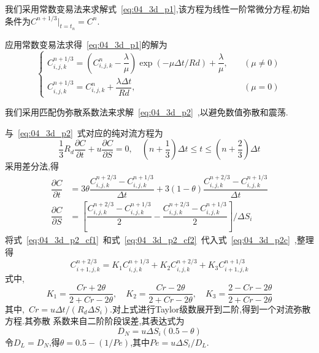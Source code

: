 我们采用常数变易法来求解式~\eqref{eq:04_3d_p1},该方程为线性一阶常微分方程,初始条件为$C^{n+1/3}|_{t=t_n}=C^n$.\par
应用常数变易法求得~\eqref{eq:04_3d_p1}的解为
\begin{equation}
\begin{cases}
C_{i,j,k}^{n+1/3}=(C_{i,j,k}^n-\dfrac{\lambda}{\mu})\exp(-\mu\Delta t/Rd)+\dfrac{\lambda}{\mu},& \quad (\mu\not=0) \\[0.8em]
C_{i,j,k}^{n+1/3}=C_{i,j,k}^n+\dfrac{\lambda\Delta t}{Rd},&\quad (\mu=0)
\end{cases}
\end{equation}\par
我们采用匹配伪弥散系数法来求解~\eqref{eq:04_3d_p2}~,以避免数值弥散和震荡.\par
与~\eqref{eq:04_3d_p2}~式对应的纯对流方程为
\begin{equation}\label{eq:04_3d_p2c}
\dfrac{1}{3} R_d\dfrac{\partial C}{\partial t}+u\dfrac{\partial C}{\partial S}=0,\quad (n+\dfrac{1}{3})\Delta t\leq t\leq (n+\dfrac{2}{3})\Delta t
\end{equation}
采用差分法,得
\begin{align}
\dfrac{\partial C}{\partial t} &= 3\theta\dfrac{C_{i,j,k}^{n+2/3}-C_{i,j,k}^{n+1/3}}{\Delta t}+3(1-\theta)\dfrac{C_{i,j,k}^{n+2/3}-C_{i,j,k}^{n+1/3}}{\Delta t} \label{eq:04_3d_p2_cf1}\\[0.6em]
\dfrac{\partial C}{\partial S} &= \left[\dfrac{C_{i,j,k}^{n+2/3}-C_{i,j,k}^{n+1/3}}{2}-\dfrac{C_{i,j,k}^{n+2/3}-C_{i,j,k}^{n+1/3}}{2}\right] / \Delta S_i \label{eq:04_3d_p2_cf2}
\end{align}
将式~\eqref{eq:04_3d_p2_cf1}~和式~\eqref{eq:04_3d_p2_cf2}~代入式~\eqref{eq:04_3d_p2c}~,整理得
\begin{equation}\label{eq:04_3d_p2zl}
C_{i+1,j,k}^{n+2/3}=K_1C_{i,j,k}^{n+1/3}+K_2C_{i,j,k}^{n+2/3}+K_3C_{i+1,j,k}^{n+1/3}
\end{equation}
式中,
\begin{equation*}
K_1=\dfrac{Cr+2\theta}{2+Cr-2\theta},\quad K_2=\dfrac{Cr-2\theta}{2+Cr-2\theta},\quad K_3=\dfrac{2-Cr-2\theta}{2+Cr-2\theta}
\end{equation*}
其中,~$Cr=u\Delta t/(R_d\Delta S_i)$.对上式进行Taylor级数展开到二阶,得到一个对流弥散方程.其弥散
系数来自二阶阶段误差,其表达式为
\begin{equation*}
D_N=u\Delta S_i(0.5-\theta)
\end{equation*}
令$D_L=D_N$,得$\theta=0.5-(1/Pe)$,其中$Pe=u\Delta S_i/D_L$.\par
